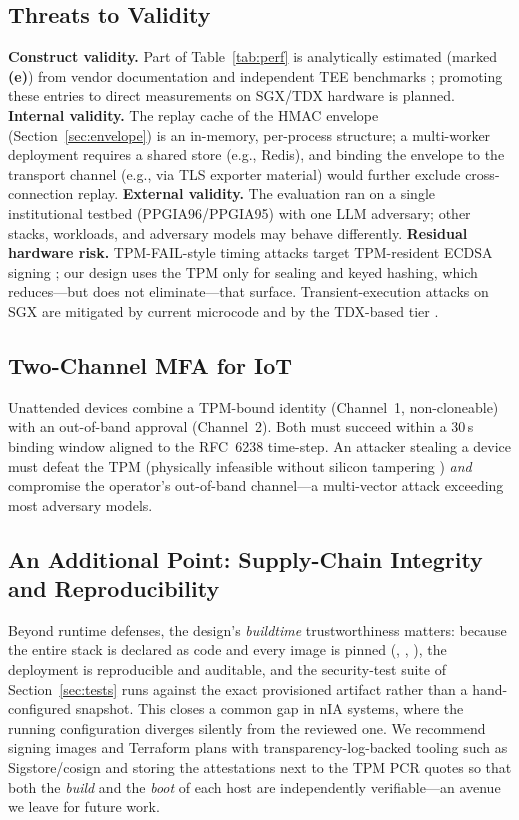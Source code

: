\documentclass[journal]{IEEEtran}
\newcommand{\ttcmd}[1]{\texttt{\seqsplit{#1}}}
\begin{document}
\subsection{Threats to Validity}
\textbf{Construct validity.} Part of Table~\ref{tab:perf} is analytically
estimated (marked \textbf{(e)}) from vendor documentation and independent TEE
benchmarks \cite{coppolino2025,kuvaiskii2024gramine}; promoting these entries
to direct measurements on SGX/TDX hardware is planned.
\textbf{Internal validity.} The replay cache of the HMAC envelope
(Section~\ref{sec:envelope}) is an in-memory, per-process structure; a
multi-worker deployment requires a shared store (e.g., Redis), and binding the
envelope to the transport channel (e.g., via TLS exporter material) would
further exclude cross-connection replay.
\textbf{External validity.} The evaluation ran on a single institutional
testbed (PPGIA96/PPGIA95) with one LLM adversary; other stacks, workloads, and
adversary models may behave differently.
\textbf{Residual hardware risk.} TPM-FAIL-style timing attacks target
TPM-resident ECDSA signing \cite{moghimi2020tpmfail}; our design uses the TPM
only for sealing and keyed hashing, which reduces---but does not
eliminate---that surface. Transient-execution attacks on SGX
\cite{vanbulck2018foreshadow} are mitigated by current microcode and by the
TDX-based tier \cite{cheng2023}.

\subsection{Two-Channel MFA for IoT}
Unattended devices combine a TPM-bound identity (Channel~1, non-cloneable) with
an out-of-band approval (Channel~2). Both must succeed within a 30\,s binding
window aligned to the RFC~6238 time-step. An attacker stealing a device must
defeat the TPM (physically infeasible without silicon tampering
\cite{halderman2008}) \emph{and} compromise the operator's out-of-band
channel---a multi-vector attack exceeding most adversary models.

\subsection{An Additional Point: Supply-Chain Integrity and Reproducibility}
Beyond runtime defenses, the design's \emph{buildtime} trustworthiness matters:
because the entire stack is declared as code and every image is pinned
(\ttcmd{vault:1.13.3}, \ttcmd{twingate/connector:1}, \ttcmd{eclipse-mosquitto:2}),
the deployment is reproducible and auditable, and the security-test suite of
Section~\ref{sec:tests} runs against the exact provisioned artifact rather than
a hand-configured snapshot. This closes a common gap in nIA systems, where the
running configuration diverges silently from the reviewed one. We recommend
signing images and Terraform plans with transparency-log-backed tooling such
as Sigstore/cosign \cite{newman2022sigstore} and storing the
attestations next to the TPM PCR quotes so that both the \emph{build} and the
\emph{boot} of each host are independently verifiable---an avenue we leave for
future work.
\end{document}
